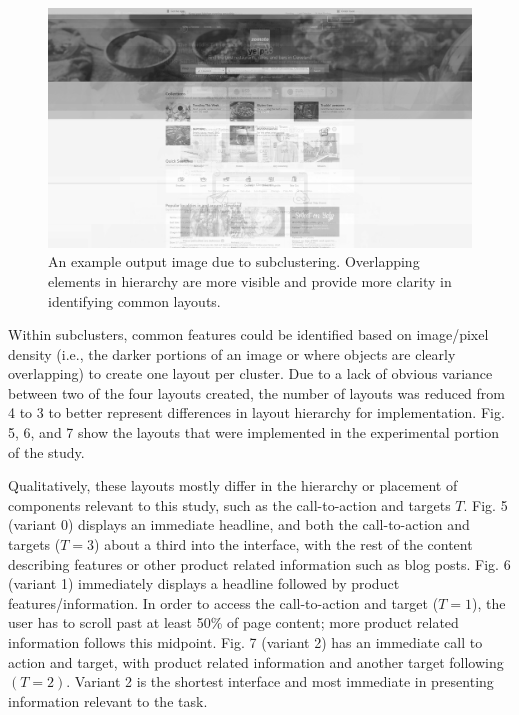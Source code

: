\documentclass[conference]{IEEEtran}
\begin{document}
\begin{figure}[h]
\centering
\label{fig:subcluster}
\includegraphics[width=\columnwidth]{media/subcluster2.png}
\caption{An example output image due to subclustering. Overlapping elements in hierarchy are more visible and provide more clarity in identifying common layouts.}
\end{figure}


Within subclusters, common features could be identified based on image/pixel density (i.e., the darker portions of an image or where objects are clearly overlapping) to create one layout per cluster. Due to a lack of obvious variance between two of the four layouts created, the number of layouts was reduced from 4 to 3 to better represent differences in layout hierarchy for implementation. Fig. 5, 6, and 7 show the layouts that were implemented in the experimental portion of the study.

Qualitatively, these layouts mostly differ in the hierarchy or placement of components relevant to this study, such as the call-to-action and targets \(T\). Fig. 5 (variant 0) displays an immediate headline, and both the call-to-action and targets (\(T = 3\)) about a third into the interface, with the rest of the content describing features or other product related information such as blog posts. Fig. 6 (variant 1) immediately displays a headline followed by product features/information. In order to access the call-to-action and target (\(T = 1\)), the user has to scroll past at least 50\% of page content; more product related information follows this midpoint. Fig. 7 (variant 2) has an immediate call to action and target, with product related information and another target following \((T = 2)\). Variant 2 is the shortest interface and most immediate in presenting information relevant to the task.
\end{document}
